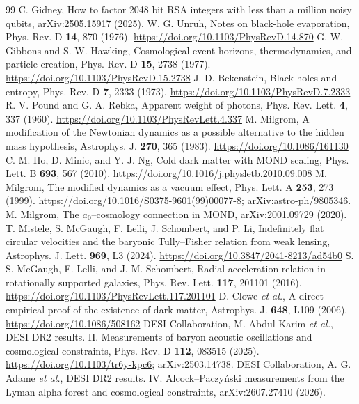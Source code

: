 \documentclass[aps,prd,twocolumn,superscriptaddress,nofootinbib,showkeys]{revtex4-2}
\begin{document}
\begin{thebibliography}{99}
 C. Gidney, How to factor 2048 bit RSA integers with less than a million noisy qubits, arXiv:2505.15917 (2025).
 W. G. Unruh, Notes on black-hole evaporation, Phys. Rev. D \textbf{14}, 870 (1976). \url{https://doi.org/10.1103/PhysRevD.14.870}
 G. W. Gibbons and S. W. Hawking, Cosmological event horizons, thermodynamics, and particle creation, Phys. Rev. D \textbf{15}, 2738 (1977). \url{https://doi.org/10.1103/PhysRevD.15.2738}
 J. D. Bekenstein, Black holes and entropy, Phys. Rev. D \textbf{7}, 2333 (1973). \url{https://doi.org/10.1103/PhysRevD.7.2333}
 R. V. Pound and G. A. Rebka, Apparent weight of photons, Phys. Rev. Lett. \textbf{4}, 337 (1960). \url{https://doi.org/10.1103/PhysRevLett.4.337}
 M. Milgrom, A modification of the Newtonian dynamics as a possible alternative to the hidden mass hypothesis, Astrophys. J. \textbf{270}, 365 (1983). \url{https://doi.org/10.1086/161130}
 C. M. Ho, D. Minic, and Y. J. Ng, Cold dark matter with MOND scaling, Phys. Lett. B \textbf{693}, 567 (2010). \url{https://doi.org/10.1016/j.physletb.2010.09.008}
 M. Milgrom, The modified dynamics as a vacuum effect, Phys. Lett. A \textbf{253}, 273 (1999). \url{https://doi.org/10.1016/S0375-9601(99)00077-8}; arXiv:astro-ph/9805346.
 M. Milgrom, The $a_0$--cosmology connection in MOND, arXiv:2001.09729 (2020).
 T. Mistele, S. McGaugh, F. Lelli, J. Schombert, and P. Li, Indefinitely flat circular velocities and the baryonic Tully--Fisher relation from weak lensing, Astrophys. J. Lett. \textbf{969}, L3 (2024). \url{https://doi.org/10.3847/2041-8213/ad54b0}
 S. S. McGaugh, F. Lelli, and J. M. Schombert, Radial acceleration relation in rotationally supported galaxies, Phys. Rev. Lett. \textbf{117}, 201101 (2016). \url{https://doi.org/10.1103/PhysRevLett.117.201101}
 D. Clowe \emph{et al.}, A direct empirical proof of the existence of dark matter, Astrophys. J. \textbf{648}, L109 (2006). \url{https://doi.org/10.1086/508162}
 DESI Collaboration, M. Abdul Karim \emph{et al.}, DESI DR2 results. II. Measurements of baryon acoustic oscillations and cosmological constraints, Phys. Rev. D \textbf{112}, 083515 (2025). \url{https://doi.org/10.1103/tr6y-kpc6}; arXiv:2503.14738.
 DESI Collaboration, A. G. Adame \emph{et al.}, DESI DR2 results. IV. Alcock--Paczy\'nski measurements from the Lyman alpha forest and cosmological constraints, arXiv:2607.27410 (2026).

\end{thebibliography}
\end{document}
